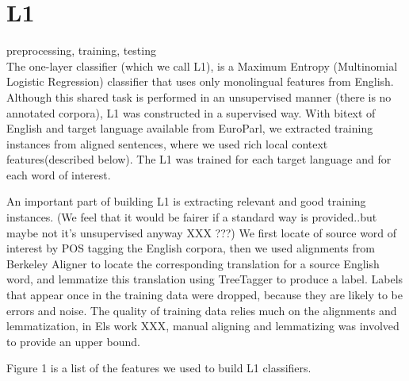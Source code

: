 \documentclass[11pt,letterpaper]{article}
\begin{document}
\section{L1}
preprocessing, training, testing\\

The one-layer classifier (which we call L1), is a Maximum Entropy (Multinomial Logistic Regression) classifier that uses only monolingual features from English.
Although this shared task is performed in an unsupervised manner (there is no annotated corpora), L1 was constructed in a supervised way.
With bitext of English and target language available from EuroParl, we extracted training instances from aligned sentences, where we used rich local context features(described below).
The L1 was trained for each target language and for each word of interest. 

An important part of building L1 is extracting relevant and good training instances. 
(We feel that it would be fairer if a standard way is provided..but maybe not it's unsupervised anyway XXX ???)
We first locate of source word of interest by POS tagging the English corpora, then 
we used alignments from Berkeley Aligner to locate the corresponding translation for a source English word,
and lemmatize this translation using TreeTagger to produce a label. Labels that appear once in the training data were dropped, because they are likely to be errors and noise.
The quality of training data relies much on the alignments and lemmatization, in Els work XXX, manual aligning and lemmatizing was involved to provide an upper bound.


Figure 1 is a list of the features we used to build L1 classifiers.


\end{document}
